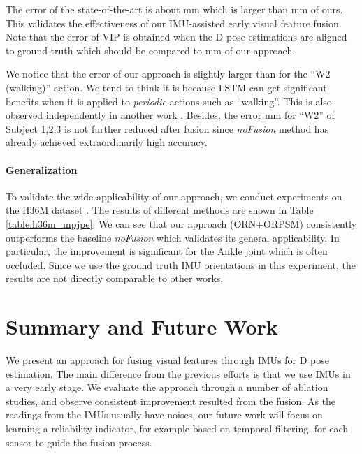 \documentclass[10pt,twocolumn,letterpaper]{article}
\begin{document}
The error of the state-of-the-art is about mm \cite{qiu2019cross} which is larger than mm of ours. This validates the effectiveness of our IMU-assisted early visual feature fusion. Note that the error of VIP \cite{von2018recovering} is obtained when the D pose estimations are aligned to ground truth which should be compared to mm of our approach. 



We notice that the error of our approach is slightly larger than \cite{trumble2018deep} for the ``W2 (walking)'' action. We tend to think it is because LSTM can get significant benefits when it is applied to \emph{periodic} actions such as ``walking''. This is also observed independently in another work \cite{gilbert2019fusing}. Besides, the error mm for ``W2'' of Subject 1,2,3 is not further reduced after fusion since \textit{noFusion} method has already achieved extraordinarily high accuracy.




\paragraph{Generalization} To validate the wide applicability of our approach, we conduct experiments on the H36M dataset \cite{ionescu2014human3}. The results of different methods are shown in Table \ref{table:h36m_mpjpe}. We can see that our approach (ORN+ORPSM) consistently outperforms the baseline \emph{noFusion} which validates its general applicability. In particular, the improvement is significant for the Ankle joint which is often occluded. Since we use the ground truth IMU orientations in this experiment, the results are not directly comparable to other works.




\section{Summary and Future Work}
We present an approach for fusing visual features through IMUs for D pose estimation. The main difference from the previous efforts is that we use IMUs in a very early stage. We evaluate the approach through a number of ablation studies, and observe consistent improvement resulted from the fusion. As the readings from the IMUs usually have noises, our future work will focus on learning a reliability indicator, for example based on temporal filtering, for each sensor to guide the fusion process.

\small


\end{document}
